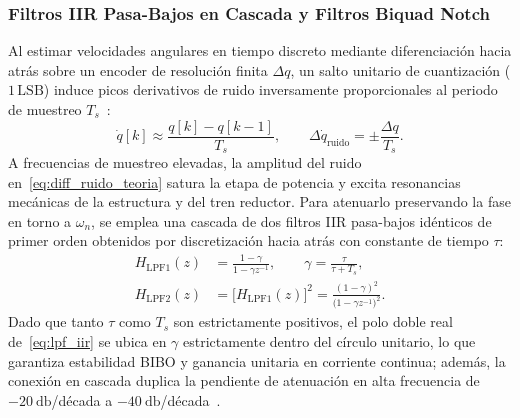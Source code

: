 \subsubsection{Filtros IIR Pasa-Bajos en Cascada y Filtros Biquad Notch}
Al estimar velocidades angulares en tiempo discreto mediante diferenciación hacia atrás sobre un encoder de resolución finita $\Delta q$, un salto unitario de cuantización ($1\,\mathrm{LSB}$) induce picos derivativos de ruido inversamente proporcionales al periodo de muestreo $T_s$~\cite{Merry2010}:
\begin{equation}
    \dot{q}[k] \approx \frac{q[k] - q[k-1]}{T_s}, \qquad
    \Delta\dot{q}_{\text{ruido}} = \pm\frac{\Delta q}{T_s}.
    \label{eq:diff_ruido_teoria}
\end{equation}
A frecuencias de muestreo elevadas, la amplitud del ruido en~\eqref{eq:diff_ruido_teoria} satura la etapa de potencia y excita resonancias mecánicas de la estructura y del tren reductor. Para atenuarlo preservando la fase en torno a $\omega_n$, se emplea una cascada de dos filtros IIR pasa-bajos idénticos de primer orden obtenidos por discretización hacia atrás con constante de tiempo $\tau$:
\begin{equation}
    \begin{aligned}
        H_{\text{LPF1}}(z) &= \frac{1 - \gamma}{1 - \gamma z^{-1}}, \qquad \gamma = \frac{\tau}{\tau + T_s}, \\
        H_{\text{LPF2}}(z) &= \bigl[H_{\text{LPF1}}(z)\bigr]^2 = \frac{(1 - \gamma)^2}{\bigl(1 - \gamma z^{-1}\bigr)^2}.
    \end{aligned}
    \label{eq:lpf_iir}
\end{equation}
Dado que tanto $\tau$ como $T_s$ son estrictamente positivos, el polo doble real de~\eqref{eq:lpf_iir} se ubica en $\gamma$ estrictamente dentro del círculo unitario, lo que garantiza estabilidad BIBO y ganancia unitaria en corriente continua; además, la conexión en cascada duplica la pendiente de atenuación en alta frecuencia de $\qty{-20}{\decibel}$/década a $\qty{-40}{\decibel}$/década~\cite{Oppenheim2010}.

